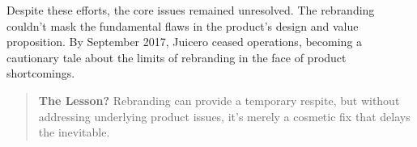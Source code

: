 \begin{tcolorbox}[colback=blue!5!white, colframe=blue!50!black,
  title={Historical Sidebar: Juicero — When Rebranding Couldn't Squeeze Out Success}]
\medskip

Despite these efforts, the core issues remained unresolved. The rebranding couldn't mask the fundamental flaws in the product's design and value proposition. By September 2017, Juicero ceased operations, becoming a cautionary tale about the limits of rebranding in the face of product shortcomings.

\medskip

\begin{quote}
\textbf{The Lesson?} Rebranding can provide a temporary respite, but without addressing underlying product issues, it's merely a cosmetic fix that delays the inevitable.
\end{quote}

\end{tcolorbox}



